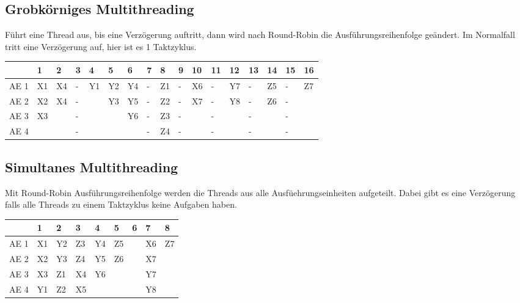 \documentclass
[
	8pt,		%
	ngerman,	%
	a4paper,	%
	landscape,	%
	final		%
]{extarticle}
\begin{document}
\begin{multicols*}{4}
\subsection{Grobkörniges Multithreading}
Führt eine Thread aus, bis eine Verzögerung auftritt, dann wird nach Round-Robin
die Ausführungsreihenfolge geändert. Im Normalfall tritt eine Verzögerung auf,
hier ist es 1 Taktzyklus.\par
\begingroup\setlength\tabcolsep{1.25pt}
\small
\vspace{\abovedisplayskip}
\begin{tabularx}{\linewidth}{|c|XXXXXXXXXXXXXXXX|}\hline
	     & 1  & 2  & 3 & 4  & 5  & 6  & 7 & 8  & 9 & 10 & 11 & 12 & 13 & 14 & 15 & 16 \\\hline
	AE 1 & X1 & X4 & - & Y1 & Y2 & Y4 & - & Z1 & - & X6 & -  & Y7 & -  & Z5 & -  & Z7 \\
	AE 2 & X2 & X4 & - &    & Y3 & Y5 & - & Z2 & - & X7 & -  & Y8 & -  & Z6 & -  &    \\
	AE 3 & X3 &    & - &    &    & Y6 & - & Z3 & - &    & -  &    & -  &    & -  &    \\
	AE 4 &    &    & - &    &    &    & - & Z4 & - &    & -  &    & -  &    & -  &    \\\hline
\end{tabularx}
\endgroup
\subsection{Simultanes Multithreading} Mit Round-Robin Ausführungsreihenfolge
werden die Threads aus alle Ausfüehrungseinheiten aufgeteilt. Dabei gibt es eine
Verzögerung falls alle Threads zu einem Taktzyklus keine Aufgaben haben.\par
\begingroup\setlength\tabcolsep{2pt}
\small
\vspace{\abovedisplayskip}
\begin{tabularx}{\linewidth}{|c|XXXXXXXX|}\hline
	     & 1  & 2  & 3  & 4  & 5  & 6 & 7  & 8  \\\hline
	AE 1 & X1 & Y2 & Z3 & Y4 & Z5 &   & X6 & Z7 \\
	AE 2 & X2 & Y3 & Z4 & Y5 & Z6 &   & X7 &    \\
	AE 3 & X3 & Z1 & X4 & Y6 &    &   & Y7 &    \\
	AE 4 & Y1 & Z2 & X5 &    &    &   & Y8 &    \\\hline
\end{tabularx}
\endgroup
\end{multicols*}
\end{document}
